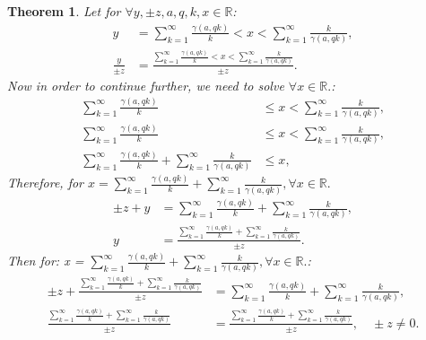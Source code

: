 \documentclass[10pt]{article}
\theoremstyle{plain}
\newtheorem{theorem}{Theorem}[section]
\theoremstyle{definition}
\theoremstyle{remark}
\begin{document}
\begin{theorem}
	Let for $\forall y, \pm z, a, q, k, x \in \mathbb{R}$:
	\begin{align*}
		y &= \sum_{k=1}^{\infty} \frac{\gamma(a, qk)}{k} < x < \sum_{k=1}^{\infty} \frac{k}{\gamma(a, qk)},\\
		\frac{y}{\pm z} &= \frac{\sum_{k=1}^{\infty} \frac{\gamma(a, qk)}{k} < x < \sum_{k=1}^{\infty} \frac{k}{\gamma(a, qk)}}{\pm z}.
	\end{align*}
	Now in order to continue further, we need to solve $\forall x \in \mathbb{R}.$:
	\begin{align*}
		\sum_{k=1}^{\infty} \frac{\gamma(a, qk)}{k} &\leq x < \sum_{k=1}^{\infty} \frac{k}{\gamma(a, qk)},\\
		\sum_{k=1}^{\infty} \frac{\gamma(a, qk)}{k} &\leq x < \sum_{k=1}^{\infty} \frac{k}{\gamma(a, qk)},\\
		\sum_{k=1}^{\infty} \frac{\gamma(a, qk)}{k} + \sum_{k=1}^{\infty} \frac{k}{\gamma(a, qk)} &\leq x,
	\end{align*}
	Therefore, for $x = \sum_{k=1}^{\infty} \frac{\gamma(a, qk)}{k} + \sum_{k=1}^{\infty} \frac{k}{\gamma(a, qk)}, \forall x \in \mathbb{R}.$
	\begin{align*}
		\pm z + y &= \sum_{k=1}^{\infty} \frac{\gamma(a, qk)}{k} + \sum_{k=1}^{\infty} \frac{k}{\gamma(a, qk)},\\
		y &= \frac{\sum_{k=1}^{\infty} \frac{\gamma(a, qk)}{k} + \sum_{k=1}^{\infty} \frac{k}{\gamma(a, qk)}}{\pm z}.
	\end{align*}
	Then for: x = $\sum_{k=1}^{\infty} \frac{\gamma(a, qk)}{k} + \sum_{k=1}^{\infty} \frac{k}{\gamma(a, qk)}, \forall x \in \mathbb{R}.$:
	\begin{align*}
		\pm z + \frac{\sum_{k=1}^{\infty} \frac{\gamma(a, qk)}{k} + \sum_{k=1}^{\infty}\frac{k}{\gamma(a, qk)}}{\pm z} &= \sum_{k=1}^{\infty} \frac{\gamma(a, qk)}{k} + \sum_{k=1}^{\infty}\frac{k}{\gamma(a, qk)},\\
		\frac{\sum_{k=1}^{\infty} \frac{\gamma(a, qk)}{k} + \sum_{k=1}^{\infty} \frac{k}{\gamma(a, qk)}}{\pm z} &= \frac{\sum_{k=1}^{\infty} \frac{\gamma(a, qk)}{k} + \sum_{k=1}^{\infty} \frac{k}{\gamma(a, qk)}}{\pm z}, \quad \pm z \neq 0.
	\end{align*}
\end{theorem}
\end{document}
